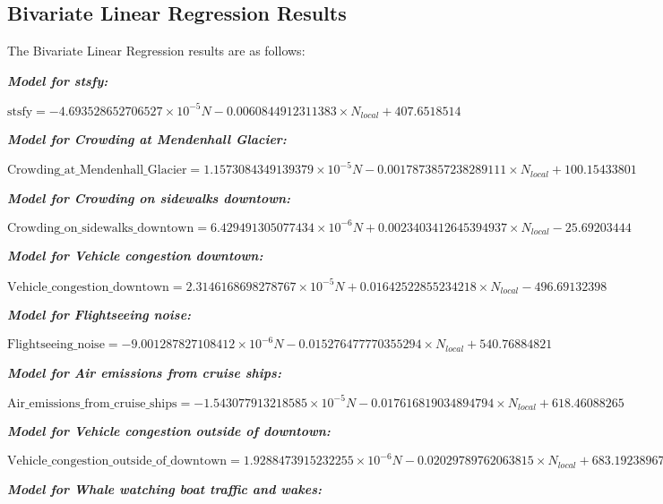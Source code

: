 \begin{appendices}
    \section{Bivariate Linear Regression Results}

The Bivariate Linear Regression results are as follows:

\vspace{0.5cm}

    \textbf{\textit{Model for stsfy: }}

    $\text{stsfy} = -4.693528652706527 \times 10^{-5} N - 0.0060844912311383 \times N_{local} + 407.6518514$
    
    \textbf{\textit{Model for Crowding at Mendenhall Glacier: }}
    
    $\text{Crowding\_at\_Mendenhall\_Glacier} = 1.1573084349139379 \times 10^{-5} N - 0.0017873857238289111 \times N_{local} + 100.15433801$
    
    \textbf{\textit{Model for Crowding on sidewalks downtown: }}
    
    $\text{Crowding\_on\_sidewalks\_downtown} = 6.429491305077434 \times 10^{-6} N + 0.0023403412645394937 \times N_{local} - 25.69203444$
    
    \textbf{\textit{Model for Vehicle congestion downtown: }}
    
    $\text{Vehicle\_congestion\_downtown} = 2.3146168698278767 \times 10^{-5} N + 0.01642522855234218 \times N_{local} - 496.69132398$
    
    \textbf{\textit{Model for Flightseeing noise: }}
    
    $\text{Flightseeing\_noise} = -9.001287827108412 \times 10^{-6} N - 0.015276477770355294 \times N_{local} + 540.76884821$
    
    \textbf{\textit{Model for Air emissions from cruise ships: }}
    
    $\text{Air\_emissions\_from\_cruise\_ships} = -1.543077913218585 \times 10^{-5} N - 0.017616819034894794 \times N_{local} + 618.46088265$
    
    \textbf{\textit{Model for Vehicle congestion outside of downtown: }}
    
    $\text{Vehicle\_congestion\_outside\_of\_downtown} = 1.9288473915232255 \times 10^{-6} N - 0.02029789762063815 \times N_{local} + 683.19238967$
    
    \textbf{\textit{Model for Whale watching boat traffic and wakes: }}
    

\end{appendices}
